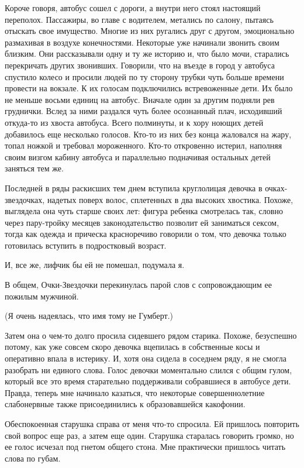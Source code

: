 \documentclass[
]{book}
\begin{document}
Короче говоря, автобус сошел с дороги, а внутри него стоял настоящий переполох. Пассажиры, во главе с водителем, метались по салону, пытаясь отыскать свое имущество. Многие из них ругались друг с другом, эмоционально размахивая в воздухе конечностями. Некоторые уже начинали звонить своим близким. Они рассказывали одну и ту же историю и, что было мочи, старались перекричать других звонивших. Говорили, что на въезде в город у автобуса спустило колесо и просили людей по ту сторону трубки чуть больше времени провести на вокзале. К их голосам подключились встревоженные дети. Их было не меньше восьми единиц на автобус. Вначале один за другим подняли рев груднички. Вслед за ними раздался чуть более осознанный плач, исходивший откуда-то из хвоста автобуса. Всего полминуты, и к хору ноющих детей добавилось еще несколько голосов. Кто-то из них без конца жаловался на жару, топал ножкой и требовал мороженного. Кто-то откровенно истерил, наполняя своим визгом кабину автобуса и параллельно подначивая остальных детей заняться тем же.

Последней в ряды раскисших тем днем вступила круглолицая девочка в очках-звездочках, надетых поверх волос, сплетенных в два высоких хвостика. Похоже, выглядела она чуть старше своих лет: фигура ребенка смотрелась так, словно через пару-тройку месяцев законодательство позволит ей заниматься сексом, тогда как одежда и прическа красноречиво говорили о том, что девочка только готовилась вступить в подростковый возраст.

И, все же, лифчик бы ей не помешал, подумала я.

В общем, Очки-Звездочки перекинулась парой слов с сопровождающим ее пожилым мужчиной.

(Я очень надеялась, что имя тому не Гумберт.)

Затем она о чем-то долго просила сидевшего рядом старика. Похоже, безуспешно потому, как уже совсем скоро девочка вцепилась в собственные косы и оперативно впала в истерику. И, хотя она сидела в соседнем ряду, я не смогла разобрать ни единого слова. Голос девочки моментально слился с общим гулом, который все это время старательно поддерживали собравшиеся в автобусе дети. Правда, теперь мне начинало казаться, что некоторые совершеннолетние слабонервные также присоединились к образовавшейся какофонии.

Обеспокоенная старушка справа от меня что-то спросила. Ей пришлось повторить свой вопрос еще раз, а затем еще один. Старушка старалась говорить громко, но ее голос исчезал под гнетом общего стона. Мне практически пришлось читать слова по губам.
\end{document}
